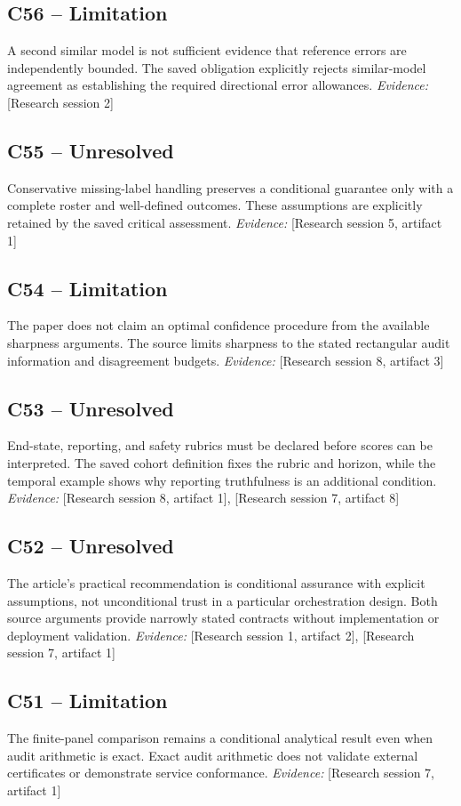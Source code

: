 \documentclass[11pt]{article}
\begin{document}
\begin{sloppypar}
\subsection{C56 -- Limitation}
A second similar model is not sufficient evidence that reference errors are independently bounded.
The saved obligation explicitly rejects similar-model agreement as establishing the required directional error allowances.
\textit{Evidence: }[Research session 2]
\subsection{C55 -- Unresolved}
Conservative missing-label handling preserves a conditional guarantee only with a complete roster and well-defined outcomes.
These assumptions are explicitly retained by the saved critical assessment.
\textit{Evidence: }[Research session 5, artifact 1]
\subsection{C54 -- Limitation}
The paper does not claim an optimal confidence procedure from the available sharpness arguments.
The source limits sharpness to the stated rectangular audit information and disagreement budgets.
\textit{Evidence: }[Research session 8, artifact 3]
\subsection{C53 -- Unresolved}
End-state, reporting, and safety rubrics must be declared before scores can be interpreted.
The saved cohort definition fixes the rubric and horizon, while the temporal example shows why reporting truthfulness is an additional condition.
\textit{Evidence: }[Research session 8, artifact 1], [Research session 7, artifact 8]
\subsection{C52 -- Unresolved}
The article's practical recommendation is conditional assurance with explicit assumptions, not unconditional trust in a particular orchestration design.
Both source arguments provide narrowly stated contracts without implementation or deployment validation.
\textit{Evidence: }[Research session 1, artifact 2], [Research session 7, artifact 1]
\subsection{C51 -- Limitation}
The finite-panel comparison remains a conditional analytical result even when audit arithmetic is exact.
Exact audit arithmetic does not validate external certificates or demonstrate service conformance.
\textit{Evidence: }[Research session 7, artifact 1]

\end{sloppypar}
\end{document}
